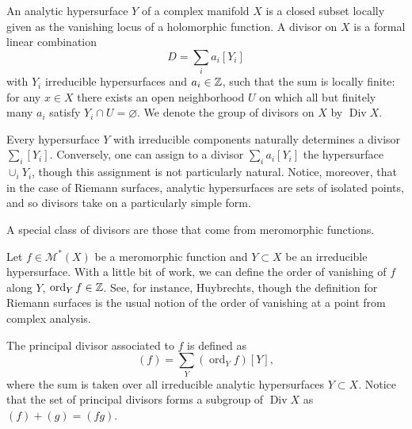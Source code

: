 \documentclass{amsart}
\DeclareMathOperator{\ord}{ord}
\DeclareMathOperator{\Div}{Div}
\begin{document}
\begin{definition}
    An {\color{blue} analytic hypersurface} $Y$ of a complex manifold $X$ is a closed subset locally given
    as the vanishing locus of a holomorphic function. A {\color{blue} divisor} on $X$ is a formal linear combination
    \begin{equation*}
        D = \sum_i a_i[Y_i]
    \end{equation*}
    with $Y_i$ irreducible hypersurfaces and $a_i\in\mathbb{Z}$, such that the sum is locally finite: for any $x\in X$
    there exists an open neighborhood $U$ on which all but finitely many $a_i$ satisfy $Y_i\cap U=\varnothing$.
    We denote the group of divisors on $X$ by $\Div X$.
\end{definition}

\begin{remark}
    Every hypersurface $Y$ with irreducible components naturally determines a divisor $\sum_i[Y_i]$. Conversely,
    one can assign to a divisor $\sum_i a_i[Y_i]$ the hypersurface $\cup_i Y_i$, though this assignment is not
    particularly natural. Notice, moreover, that in the case of Riemann surfaces, analytic hypersurfaces are
    sets of isolated points, and so divisors take on a particularly simple form.
\end{remark}

A special class of divisors are those that come from meromorphic functions.
\begin{definition}
    Let $f\in\mathcal{M}^*(X)$ be a meromorphic function and $Y\subset X$ be an irreducible hypersurface.
    With a little bit of work, we can define the {\color{blue}order of vanishing of $f$ along $Y$}, $\ord_Y f\in\Z$.
    See, for instance, Huybrechts, though the definition for Riemann surfaces is the usual notion of the
    order of vanishing at a point from complex analysis.

    The {\color{blue}principal divisor associated to $f$} is defined as
    \begin{equation*}
        (f) = \sum_Y (\ord_Y f)[Y],
    \end{equation*}
    where the sum is taken over all irreducible analytic hypersurfaces $Y\subset X$. Notice that the set
    of principal divisors forms a subgroup of $\Div X$ as $(f)+(g)=(fg)$.
\end{definition}
\end{document}
